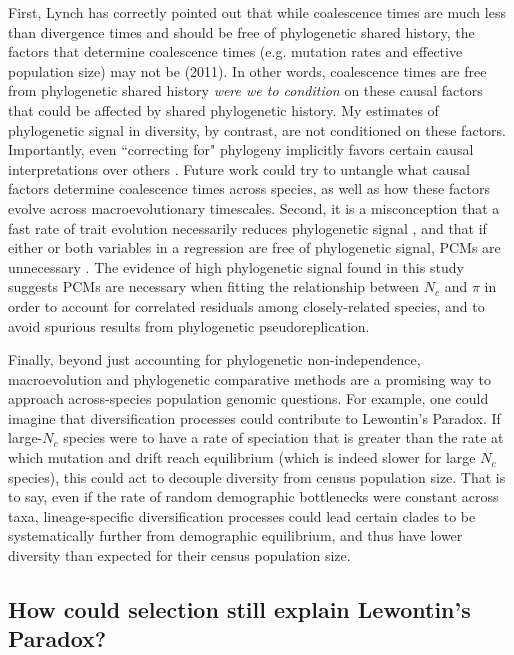 \documentclass[9pt,lineno]{elife}
\begin{document}
First, Lynch has correctly pointed out that while coalescence times are much
less than divergence times and should be free of phylogenetic shared history,
the factors that determine coalescence times (e.g.  mutation rates and
effective population size) may not be (2011). In other words, coalescence times
are free from phylogenetic shared history \emph{were we to condition} on these
causal factors that could be affected by shared phylogenetic history. My
estimates of phylogenetic signal in diversity, by contrast, are not conditioned
on these factors. Importantly, even ``correcting for" phylogeny implicitly
favors certain causal interpretations over others
\citep{Westoby1995-wz,Uyeda2018-wf}.  Future work could try to untangle what
causal factors determine coalescence times across species, as well as how these
factors evolve across macroevolutionary timescales. Second, it is a
misconception that a fast rate of trait evolution necessarily reduces
phylogenetic signal \citep{Revell2008-in}, and that if either or both variables
in a regression are free of phylogenetic signal, PCMs are unnecessary
\citep{Revell2010-mf,Uyeda2018-wf}. The evidence of high phylogenetic signal
found in this study suggests PCMs are necessary when fitting the relationship
between $N_c$ and $\pi$ in order to account for correlated residuals among
closely-related species, and to avoid spurious results from phylogenetic
pseudoreplication.

Finally, beyond just accounting for phylogenetic non-independence,
macroevolution and phylogenetic comparative methods are a promising way to
approach across-species population genomic questions. For example, one could
imagine that diversification processes could contribute to Lewontin's Paradox.
If large-$N_c$ species were to have a rate of speciation that is greater than
the rate at which mutation and drift reach equilibrium (which is indeed slower
for large $N_c$ species), this could act to decouple diversity from census
population size. That is to say, even if the rate of random demographic
bottlenecks were constant across taxa, lineage-specific diversification
processes could lead certain clades to be systematically further from
demographic equilibrium, and thus have lower diversity than expected for their
census population size. 

\subsection{How could selection still explain Lewontin's Paradox?}
\end{document}
